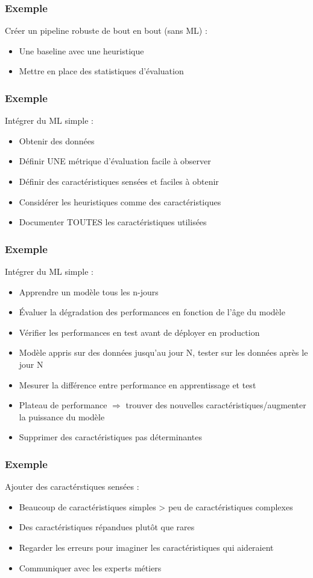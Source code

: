 \begin{frame}
  \frametitle{Exemple}
  Créer un pipeline robuste de bout en bout (sans ML) :
  \begin{itemize}
  \item Une baseline avec une heuristique
  \item Mettre en place des statistiques d'évaluation
  \end{itemize}
\end{frame}

\begin{frame}
  \frametitle{Exemple}
  Intégrer du ML simple :
  \begin{itemize}
  \item Obtenir des données
  \item Définir UNE métrique d'évaluation facile à observer
  \item Définir des caractéristiques sensées et faciles à obtenir
  \item Considérer les heuristiques comme des caractéristiques
  \item Documenter TOUTES les caractéristiques utilisées
  \end{itemize}
\end{frame}

\begin{frame}
  \frametitle{Exemple}
  Intégrer du ML simple :
  \begin{itemize}
  \item Apprendre un modèle tous les n-jours
  \item Évaluer la dégradation des performances en fonction de l'âge du modèle
  \item Vérifier les performances en test avant de déployer en production
  \item Modèle appris sur des données jusqu'au jour N, tester sur les données après le jour N
  \item Mesurer la différence entre performance en apprentissage et test
  \item Plateau de performance $\Rightarrow$ trouver des nouvelles caractéristiques/augmenter la puissance du modèle
  \item Supprimer des caractéristiques pas déterminantes
  \end{itemize}
\end{frame}

\begin{frame}
  \frametitle{Exemple}
  Ajouter des caractérstiques sensées :
  \begin{itemize}
  \item Beaucoup de caractéristiques simples > peu de caractéristiques complexes
  \item Des caractéristiques répandues plutôt que rares
  \item Regarder les erreurs pour imaginer les caractéristiques qui aideraient
  \item Communiquer avec les experts métiers
  \end{itemize}
\end{frame}

